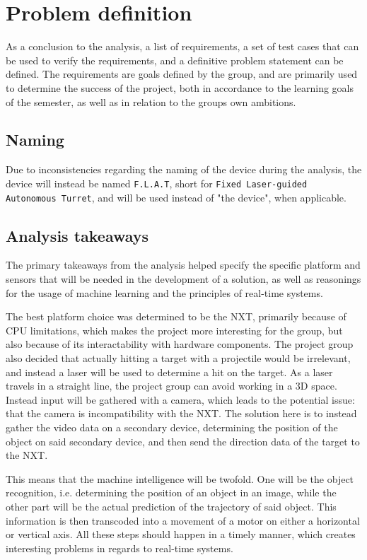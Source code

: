 \newpage
\section{Problem definition}
As a conclusion to the analysis, a list of requirements, a set of test cases that can be used to verify the requirements, and a definitive problem statement can be defined.
The requirements are goals defined by the group, and are primarily used to determine the success of the project, both in accordance to the learning goals of the semester, as well as in relation to the groups own ambitions.

\subsection{Naming}
Due to inconsistencies regarding the naming of the device during the analysis, the device will instead be named \texttt{F.L.A.T}, short for \texttt{Fixed Laser-guided Autonomous Turret}, and will be used instead of "the device", when applicable.

\subsection{Analysis takeaways}
The primary takeaways from the analysis helped specify the specific platform and sensors that will be needed in the development of a solution, as well as reasonings for the usage of machine learning and the principles of real-time systems.

The best platform choice was determined to be the NXT, primarily because of CPU limitations, which makes the project more interesting for the group, but also because of its interactability with hardware components.
The project group also decided that actually hitting a target with a projectile would be irrelevant, and instead a laser will be used to determine a hit on the target.
As a laser travels in a straight line, the project group can avoid working in a 3D space.
Instead input will be gathered with a camera, which leads to the potential issue: that the camera is incompatibility with the NXT.
The solution here is to instead gather the video data on a secondary device, determining the position of the object on said secondary device, and then send the direction data of the target to the NXT.

This means that the machine intelligence will be twofold.
One will be the object recognition, i.e. determining the position of an object in an image, while the other part will be the actual prediction of the trajectory of said object.
This information is then transcoded into a movement of a motor on either a horizontal or vertical axis.
All these steps should happen in a timely manner, which creates interesting problems in regards to real-time systems.

